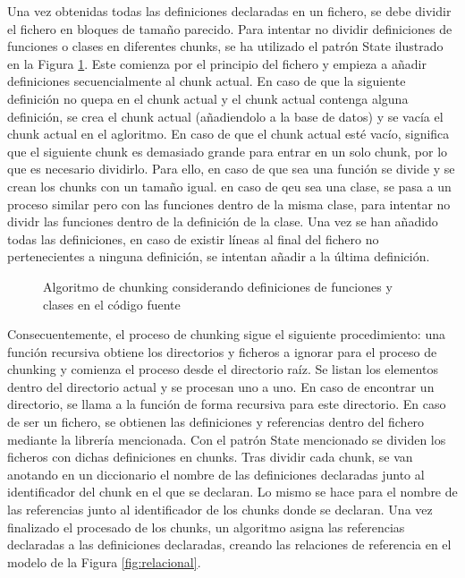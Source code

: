 Una vez obtenidas todas las definiciones declaradas en un fichero, se debe dividir el fichero en bloques de tamaño parecido. Para intentar no dividir definiciones de funciones o clases en diferentes chunks, se ha utilizado el patrón State ilustrado en la Figura \ref{fig:chunks}. Este comienza por el principio del fichero y empieza a añadir definiciones secuencialmente al chunk actual. En caso de que la siguiente definición no quepa en el chunk actual y el chunk actual contenga alguna definición, se crea el chunk actual (añadiendolo a la base de datos) y se vacía el chunk actual en el agloritmo. En caso de que el chunk actual esté vacío, significa que el siguiente chunk es demasiado grande para entrar en un solo chunk, por lo que es necesario dividirlo. Para ello, en caso de que sea una función se divide y se crean los chunks con un tamaño igual. en caso de qeu sea una clase, se pasa a un proceso similar pero con las funciones dentro de la misma clase, para intentar no dividr las funciones dentro de la definición de la clase. Una vez se han añadido todas las definiciones, en caso de existir líneas al final del fichero no pertenecientes a ninguna definición, se intentan añadir a la última definición.

\begin{figure}[h]
  \centering
  \caption{Algoritmo de chunking considerando definiciones de funciones y clases en el código fuente}
  \label{fig:chunks}
\end{figure}

Consecuentemente, el proceso de chunking sigue el siguiente procedimiento: una función recursiva obtiene los directorios y ficheros a ignorar para el proceso de chunking y comienza el proceso desde el directorio raíz. Se listan los elementos dentro del directorio actual y se procesan uno a uno. En caso de encontrar un directorio, se llama a la función de forma recursiva para este directorio. En caso de ser un fichero, se obtienen las definiciones y referencias dentro del fichero mediante la librería mencionada. Con el patrón State mencionado se dividen los ficheros con dichas definiciones en chunks. Tras dividir cada chunk, se van anotando en un diccionario el nombre de las definiciones declaradas junto al identificador del chunk en el que se declaran. Lo mismo se hace para el nombre de las referencias junto al identificador de los chunks donde se declaran. Una vez finalizado el procesado de los chunks, un algoritmo asigna las referencias declaradas a las definiciones declaradas, creando las relaciones de referencia en el modelo de la Figura \ref{fig:relacional}.

